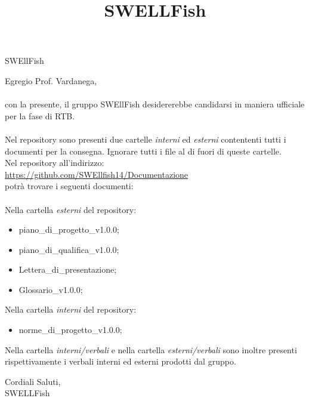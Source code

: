 \documentclass[12pt]{article}
\begin{document}
\graphicspath{ {../templates/img/} }
\title{SWELLFish}

\firstPage
\begin{center}
{\Large SWEllFish}\\[24pt]
\end{center}

Egregio Prof. Vardanega,\\\\
con la presente, il gruppo SWEllFish desidererebbe candidarsi in maniera ufficiale
per la fase di RTB.\\\\
Nel repository sono presenti due cartelle \textit{interni} ed \textit{esterni} contententi tutti i documenti per la consegna. Ignorare tutti i file
al di fuori di queste cartelle.\\
Nel repository all'indirizzo: \\
\href{https://github.com/SWEllfish14/Documentazione}{\underline{https://github.com/SWEllfish14/Documentazione}}\\ 
potrà trovare i seguenti documenti:\\\\

Nella cartella \textit{esterni} del repository:
\begin{itemize}
\item piano\_di\_progetto\_v1.0.0;
\item piano\_di\_qualifica\_v1.0.0;
\item Lettera\_di\_presentazione;
\item Glossario\_v1.0.0;
\end{itemize}
Nella cartella \textit{interni} del repository:
\begin{itemize}
    \item norme\_di\_progetto\_v1.0.0;
\end{itemize}
 Nella cartella \textit{interni/verbali} e nella cartella \textit{esterni/verbali} sono inoltre presenti rispettivamente i verbali interni ed esterni prodotti dal gruppo. 

\begin{flushright}
Cordiali Saluti,\\
SWELLFish
\end{flushright}
\end{document}

